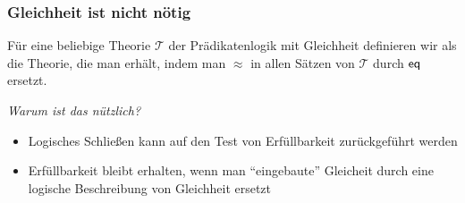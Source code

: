 \documentclass[aspectratio=1610,onlymath]{beamer}
\begin{document}
\begin{frame}\frametitle{Gleichheit ist nicht nötig}

Für eine beliebige Theorie $\mathcal{T}$ der Prädikatenlogik mit Gleichheit
definieren wir  als die Theorie, die man erhält,
indem man $\approx$ in allen Sätzen von $\mathcal{T}$ durch $\textsf{eq}$ ersetzt.
\bigskip

\pause

\emph{Warum ist das nützlich?}
\begin{itemize}
\item Logisches Schließen kann auf den Test von Erfüllbarkeit zurückgeführt werden
\item Erfüllbarkeit bleibt erhalten, wenn man "`eingebaute"' Gleicheit durch eine logische 
Beschreibung von Gleichheit ersetzt
\end{itemize}

\end{frame}
\end{document}
